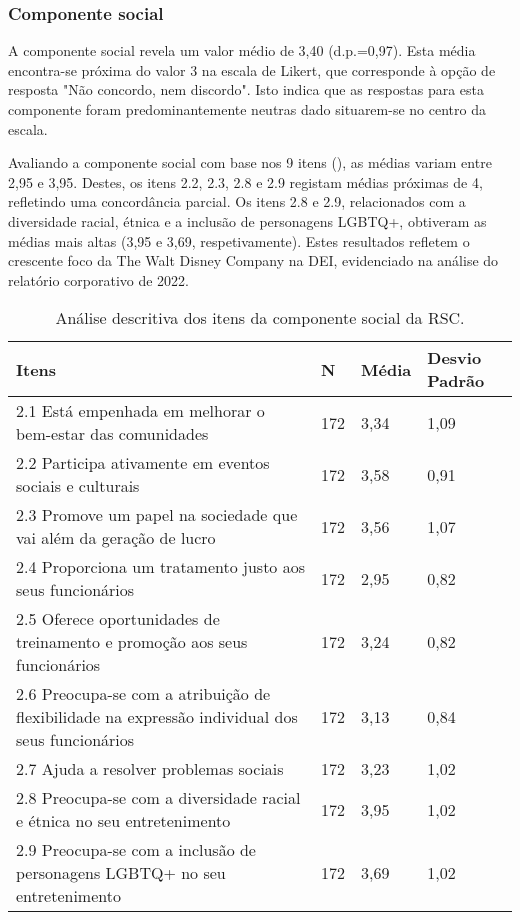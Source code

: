 \documentclass[portuguese]{textolivre}
\begin{document}
\subsubsection{Componente social}\label{sec-outras-estr}
A componente social revela um valor médio de 3,40 (d.p.=0,97). Esta média encontra-se próxima do valor 3 na escala de Likert, que corresponde à opção de resposta "Não concordo, nem discordo". Isto indica que as respostas para esta componente foram predominantemente neutras dado situarem-se no centro da escala.

Avaliando a componente social com base nos 9 itens (), as médias variam entre 2,95 e 3,95. Destes, os itens 2.2, 2.3, 2.8 e 2.9 registam médias próximas de 4, refletindo uma concordância parcial. Os itens 2.8 e 2.9, relacionados com a diversidade racial, étnica e a inclusão de personagens LGBTQ+, obtiveram as médias mais altas (3,95 e 3,69, respetivamente). Estes resultados refletem o crescente foco da The Walt Disney Company na DEI, evidenciado na análise do relatório corporativo de 2022.

\begin{table}[h!]
\centering
\begin{threeparttable}
\caption{Análise descritiva dos itens da componente social da RSC.}
\label{tab01}
\begin{tabular}{p{8cm} p{1cm} p{1cm} p{1cm}}
\toprule
 Itens & N & \multicolumn{1}{p{1cm}}{Média} & \multicolumn{1}{p{1.2cm}}{Desvio Padrão} \\
\midrule
2.1 Está empenhada em melhorar o bem-estar das comunidades & 172 & 3,34 & 1,09 \\
2.2 Participa ativamente em eventos sociais e culturais & 172 & 3,58 & 0,91 \\
2.3 Promove um papel na sociedade que vai além da geração de lucro & 172 & 3,56 & 1,07 \\
2.4 Proporciona um tratamento justo aos seus funcionários & 172 & 2,95 & 0,82 \\
2.5 Oferece oportunidades de treinamento e promoção aos seus funcionários &
172 & 3,24 & 0,82 \\
2.6 Preocupa-se com a atribuição de flexibilidade na expressão individual dos seus funcionários & 172 & 3,13 & 0,84 \\
2.7 Ajuda a resolver problemas sociais & 172 & 3,23 & 1,02 \\
2.8 Preocupa-se com a diversidade racial e étnica no seu entretenimento &
172 & 3,95 & 1,02 \\
2.9 Preocupa-se com a inclusão de personagens LGBTQ+ no seu entretenimento &
172 & 3,69 & 1,02 \\
\bottomrule
\end{tabular}
\end{threeparttable}
\end{table}
\end{document}
